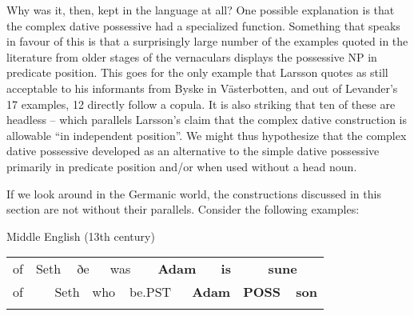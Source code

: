 \begin{styleBodytextC}
Why was it, then, kept in the language at all? One possible explanation is that the complex dative possessive had a specialized function. Something that speaks in favour of this is that a surprisingly large number of the examples quoted in the literature from older stages of the vernaculars displays the possessive NP in predicate position. This goes for the only example that Larsson quotes as still acceptable to his informants from Byske in Västerbotten, and out of Levander’s 17 examples, 12 directly follow a copula. It is also striking that ten of these are headless – which parallels Larsson’s claim that the complex dative construction is allowable “in independent position”. We might thus hypothesize that the complex dative possessive developed as an alternative to the simple dative possessive primarily in predicate position and/or when used without a head noun. 

\end{styleBodytextC}

\begin{styleBodytextC}
If we look around in the Germanic world, the constructions discussed in this section are not without their parallels. Consider the following examples: 

\end{styleBodytextC}

\begin{listWWNumileveli}
\item {}

\begin{styleExample}
\label{bkm:Ref126571184}Middle English (13th century)

\end{styleExample}

\end{listWWNumileveli}

\begin{tabular}{llllllllllllll}
\lsptoprule
of & \multicolumn{2}{l}{Seth

} & \multicolumn{2}{l}{ðe

} & \multicolumn{2}{l}{was

} & \multicolumn{2}{l}{{\bfseries Adam}

} & \multicolumn{2}{l}{{\bfseries is}

} & \multicolumn{2}{l}{{\bfseries sune}

} & \\
\multicolumn{2}{l}{of

} & \multicolumn{2}{l}{Seth

} & \multicolumn{2}{l}{who

} & \multicolumn{2}{l}{be.PST

} & \multicolumn{2}{l}{{\bfseries Adam}

} & \multicolumn{2}{l}{{\bfseries POSS}

} & \multicolumn{2}{l}{{\bfseries son}

}\\
\lspbottomrule
\end{tabular}

